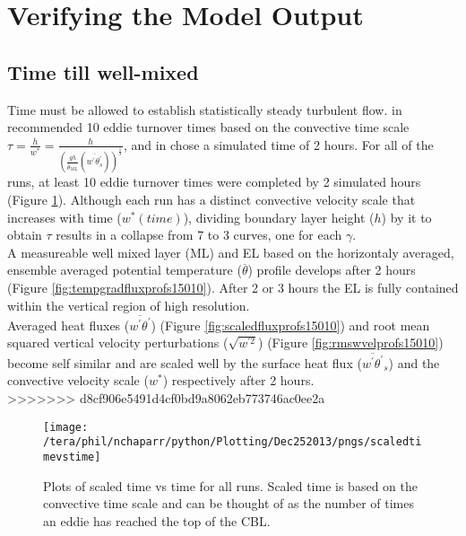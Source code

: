 \clearpage

\section{Verifying the Model Output}
\label{sec:CheckingtheModel}
\subsection{Time till well-mixed}%
\FloatBarrier

Time must be allowed to establish statistically steady turbulent flow.  \citeauthor{SullMoengStev} in 
\cite{SullMoengStev} recommended 10 eddie turnover times based on the convective time scale 
$\tau = \frac{h}{w^{*}} = \frac{h}{ \left( \frac{gh}{\overline{\theta}_{ML}}(\overline{w^{'} \theta^{'}_{s}}) \right)^{\frac{1}{3}} } $, 
and \citeauthor{BrooksFowler2} in \cite{BrooksFowler2} chose a simulated time of 2 hours.  For all of 
the runs, at least 10 eddie turnover times were completed by 2 simulated hours (Figure \ref{fig:ScaledTimevsTime}).  
Although each run has a distinct convective velocity scale that increases with time ($w^{*}(time)$), 
dividing boundary layer height ($h$) by it to obtain $\tau$ results in a collapse from 7 to 3 curves, 
one for each $\gamma$.\\

A measureable well mixed layer (\acs{ML}) and \acs{EL} based on the horizontaly averaged, ensemble averaged
potential temperature ($\overline{\theta}$) profile develops after 2 hours 
(Figure \ref{fig:tempgradfluxprofs15010}).  After 2 or 3 hours the \acs{EL} is fully contained within the vertical 
region of high resolution.\\

Averaged heat fluxes ($\overline{w^{'}\theta^{'}}$) (Figure \ref{fig:scaledfluxprofs15010}) and 
root mean squared vertical velocity perturbations ($\sqrt{w^{'2}}$) (Figure \ref{fig:rmswvelprofs15010})
become self similar and are scaled well by the surface heat flux ($\overline{w^{'}\theta^{'}}_{s}$) 
and the convective velocity scale ($w^{*}$) respectively after 2 hours.\\
>>>>>>> d8cf906e5491d4cf0bd9a8062eb773746ac0ee2a


\begin{figure}[!h]
    \centering
    \texttt{[image: /tera/phil/nchaparr/python/Plotting/Dec252013/pngs/scaledtimevstime]}
    \caption{Plots of scaled time vs time for all runs.  Scaled time is based on the convective time scale 
    and can be thought of as the number of times an eddie has reached the top of the CBL. }
    \label{fig:ScaledTimevsTime}   
\end{figure}

